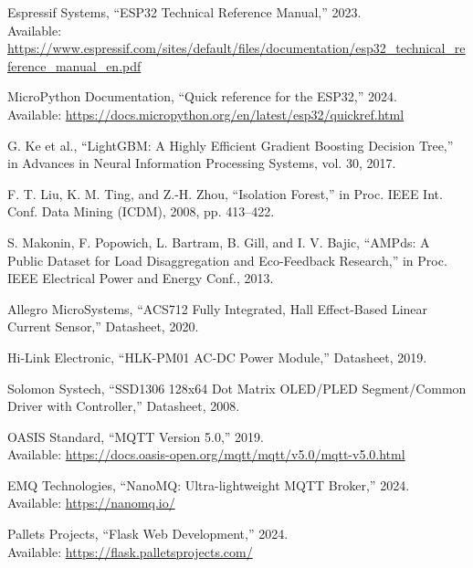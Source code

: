 \documentclass[12pt, a4paper]{article}
\begin{document}
	\begin{enumerate}[label={[\arabic*]}, leftmargin=*, topsep=6pt, itemsep=6pt]
		\item Espressif Systems, ``ESP32 Technical Reference Manual,'' 2023. \\ Available: \url{https://www.espressif.com/sites/default/files/documentation/esp32_technical_reference_manual_en.pdf}
		
		\item MicroPython Documentation, ``Quick reference for the ESP32,'' 2024. \\ Available: \url{https://docs.micropython.org/en/latest/esp32/quickref.html}
		
		\item G. Ke et al., ``LightGBM: A Highly Efficient Gradient Boosting Decision Tree,'' in Advances in Neural Information Processing Systems, vol. 30, 2017.
		
		\item F. T. Liu, K. M. Ting, and Z.-H. Zhou, ``Isolation Forest,'' in Proc. IEEE Int. Conf. Data Mining (ICDM), 2008, pp. 413--422.
		
		\item S. Makonin, F. Popowich, L. Bartram, B. Gill, and I. V. Bajic, ``AMPds: A Public Dataset for Load Disaggregation and Eco-Feedback Research,'' in Proc. IEEE Electrical Power and Energy Conf., 2013.
		
		\item Allegro MicroSystems, ``ACS712 Fully Integrated, Hall Effect-Based Linear Current Sensor,'' Datasheet, 2020.
		
		\item Hi-Link Electronic, ``HLK-PM01 AC-DC Power Module,'' Datasheet, 2019.
		
		\item Solomon Systech, ``SSD1306 128x64 Dot Matrix OLED/PLED Segment/Common Driver with Controller,'' Datasheet, 2008.
		
		\item OASIS Standard, ``MQTT Version 5.0,'' 2019. \\ Available: \url{https://docs.oasis-open.org/mqtt/mqtt/v5.0/mqtt-v5.0.html}
		
		\item EMQ Technologies, ``NanoMQ: Ultra-lightweight MQTT Broker,'' 2024. \\ Available: \url{https://nanomq.io/}
		
		\item Pallets Projects, ``Flask Web Development,'' 2024. \\ Available: \url{https://flask.palletsprojects.com/}
		

\end{enumerate}
\end{document}
